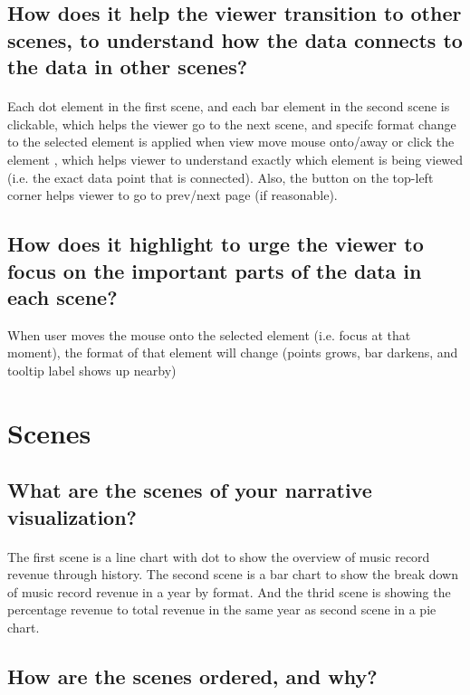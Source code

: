 \documentclass[letterpaper, 11pt]{article}
\begin{document}
\subsection{How does it help the viewer transition to other scenes, to understand how the data connects to the data in other scenes?}
\label{subsec:VisualStructure3}
\paragraph{}Each dot element in the first scene, and each bar element in the second scene is clickable, which helps the viewer go to the next scene, and specifc format change to the selected element is applied when view move mouse onto/away or click the element
, which helps viewer to understand exactly which element is being viewed (i.e. the exact data point that is connected). Also, the button on the top-left corner helps viewer to go to prev/next page (if reasonable).

\subsection{How does it highlight to urge the viewer to focus on the important parts of the data in each scene?}
\label{subsec:VisualStructure4}
When user moves the mouse onto the selected element (i.e. focus at that moment), the format of that element will change (points grows, bar darkens, and tooltip label shows up nearby)

\section{Scenes}
\label{sec:Scenes}
\subsection{What are the scenes of your narrative visualization?}
\label{subsec:Scenes1}
\paragraph{}The first scene is a line chart with dot to show the overview of music record revenue through history.
The second scene is a bar chart to show the break down of music record revenue in a year by format. And the thrid scene is showing the percentage revenue to total revenue in the same year as second scene in a pie chart.
\subsection{How are the scenes ordered, and why?}
\label{subsec:Scenes2}
\end{document}
